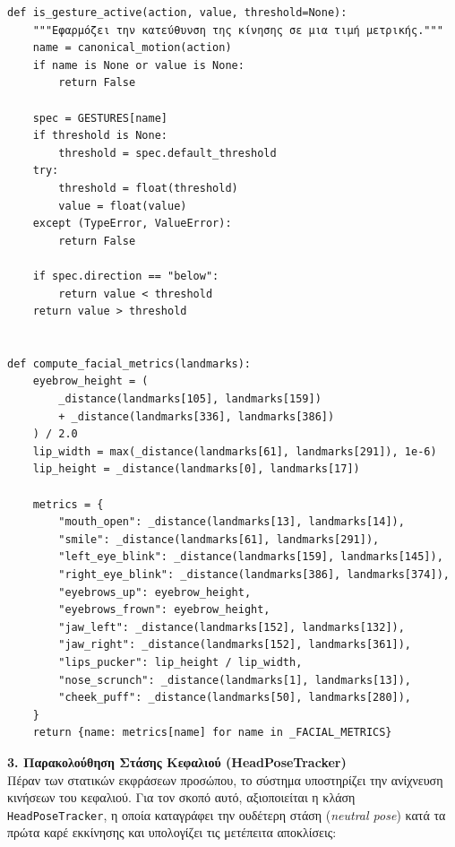 \documentclass[twoside, a4paper, 11pt]{article}
\newcommand{\textlatin}[1]{\textenglish{#1}}
\begin{document}
\begin{verbatim}
def is_gesture_active(action, value, threshold=None):
    """Εφαρμόζει την κατεύθυνση της κίνησης σε μια τιμή μετρικής."""
    name = canonical_motion(action)
    if name is None or value is None:
        return False

    spec = GESTURES[name]
    if threshold is None:
        threshold = spec.default_threshold
    try:
        threshold = float(threshold)
        value = float(value)
    except (TypeError, ValueError):
        return False

    if spec.direction == "below":
        return value < threshold
    return value > threshold


def compute_facial_metrics(landmarks):
    eyebrow_height = (
        _distance(landmarks[105], landmarks[159])
        + _distance(landmarks[336], landmarks[386])
    ) / 2.0
    lip_width = max(_distance(landmarks[61], landmarks[291]), 1e-6)
    lip_height = _distance(landmarks[0], landmarks[17])

    metrics = {
        "mouth_open": _distance(landmarks[13], landmarks[14]),
        "smile": _distance(landmarks[61], landmarks[291]),
        "left_eye_blink": _distance(landmarks[159], landmarks[145]),
        "right_eye_blink": _distance(landmarks[386], landmarks[374]),
        "eyebrows_up": eyebrow_height,
        "eyebrows_frown": eyebrow_height,
        "jaw_left": _distance(landmarks[152], landmarks[132]),
        "jaw_right": _distance(landmarks[152], landmarks[361]),
        "lips_pucker": lip_height / lip_width,
        "nose_scrunch": _distance(landmarks[1], landmarks[13]),
        "cheek_puff": _distance(landmarks[50], landmarks[280]),
    }
    return {name: metrics[name] for name in _FACIAL_METRICS}
\end{verbatim}

\textbf{3. Παρακολούθηση Στάσης Κεφαλιού (\textlatin{HeadPoseTracker})}\\
Πέραν των στατικών εκφράσεων προσώπου, το σύστημα υποστηρίζει την ανίχνευση κινήσεων του κεφαλιού. Για τον σκοπό αυτό, αξιοποιείται η κλάση \texttt{HeadPoseTracker}, η οποία καταγράφει την ουδέτερη στάση (\textit{neutral pose}) κατά τα πρώτα καρέ εκκίνησης και υπολογίζει τις μετέπειτα αποκλίσεις:
\end{document}
